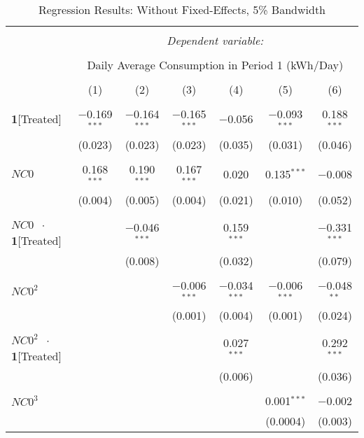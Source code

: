 \begin{table}[!htbp]
\centering 
\caption{Regression Results: Without Fixed-Effects, 5\% Bandwidth} 
\label{Table:Regression-Results_Daily-Average_5P-BW-Without-FEs} 
\small 
\begin{adjustbox}{scale = 0.8}
\begin{tabular}{@{\extracolsep{25pt}}lcccccc} 
\\[-1.8ex]\hline 
\hline \\[-1.8ex] 
 & \multicolumn{6}{c}{\textit{Dependent variable:}} \\ 
\cline{2-7} 
\\[-1.8ex] & \multicolumn{6}{c}{Daily Average Consumption in Period 1 (kWh/Day)} \\ 
\\[-1.8ex] & (1) & (2) & (3) & (4) & (5) & (6)\\ 
\hline \\[-1.8ex] 
 \textbf{1}[Treated] & $-$0.169$^{***}$ & $-$0.164$^{***}$ & $-$0.165$^{***}$ & $-$0.056 & $-$0.093$^{***}$ & 0.188$^{***}$ \\ 
  & (0.023) & (0.023) & (0.023) & (0.035) & (0.031) & (0.046) \\ 
  & & & & & & \\ 
 $NC0$ & 0.168$^{***}$ & 0.190$^{***}$ & 0.167$^{***}$ & 0.020 & 0.135$^{***}$ & $-$0.008 \\ 
  & (0.004) & (0.005) & (0.004) & (0.021) & (0.010) & (0.052) \\ 
  & & & & & & \\ 
 $NC0$ $\ \cdot \ $ \textbf{1}[Treated] &  & $-$0.046$^{***}$ &  & 0.159$^{***}$ &  & $-$0.331$^{***}$ \\ 
  &  & (0.008) &  & (0.032) &  & (0.079) \\ 
  & & & & & & \\ 
 $NC0^{2}$ &  &  & $-$0.006$^{***}$ & $-$0.034$^{***}$ & $-$0.006$^{***}$ & $-$0.048$^{**}$ \\ 
  &  &  & (0.001) & (0.004) & (0.001) & (0.024) \\ 
  & & & & & & \\ 
 $NC0^{2}$ $\ \cdot \ $ \textbf{1}[Treated] &  &  &  & 0.027$^{***}$ &  & 0.292$^{***}$ \\ 
  &  &  &  & (0.006) &  & (0.036) \\ 
  & & & & & & \\ 
 $NC0^{3}$ &  &  &  &  & 0.001$^{***}$ & $-$0.002 \\ 
  &  &  &  &  & (0.0004) & (0.003) \\ 

\end{tabular}
\end{adjustbox}
\end{table}
